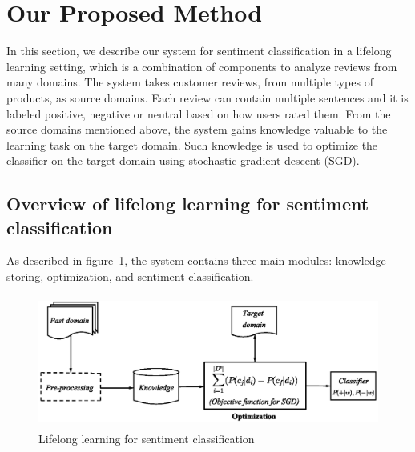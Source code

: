 \section{Our Proposed Method}

In this section, we describe our system for sentiment classification in a lifelong learning setting, which is a combination of components to analyze reviews from many domains.
The system takes customer reviews, from multiple types of products, as source domains.
Each review can contain multiple sentences and it is labeled positive, negative or neutral based on how users rated them.
From the source domains mentioned above, the system gains knowledge valuable to the learning task on the target domain.
Such knowledge is used to optimize the classifier on the target domain using stochastic gradient descent (SGD).
          
\subsection{Overview of lifelong learning for sentiment classification}
As described in figure~\ref{figure: LLL}, the system contains three main modules: knowledge storing, optimization, and sentiment classification.

\begin{figure}
	\centering                                    
	\includegraphics[height=4.35cm]{process_vector}
	\caption{Lifelong learning for sentiment classification}
	\label{figure: LLL}
\end{figure}

